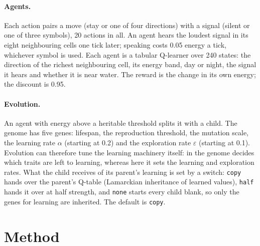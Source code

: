 \documentclass[letterpaper]{article}
\newcommand{\cond}[1]{\texttt{#1}}
\begin{document}
\paragraph{Agents.} Each action pairs a move (stay or one of four directions) with a signal (silent
or one of three symbols), 20 actions in all. An agent hears the loudest signal in its eight
neighbouring cells one tick later; speaking costs 0.05 energy a tick, whichever symbol is used. Each
agent is a tabular Q-learner \citep{watkins1992} over 240 states: the direction of the richest
neighbouring cell, its energy band, day or night, the signal it hears and whether it is near water.
The reward is the change in its own energy; the discount is 0.95.

\paragraph{Evolution.} An agent with energy above a heritable threshold splits it with a child. The
genome has five genes: lifespan, the reproduction threshold, the mutation scale, the learning rate
$\alpha$ (starting at 0.2) and the exploration rate $\varepsilon$ (starting at 0.1). Evolution can
therefore tune the learning machinery itself: in \citet{hinton1987} the genome decides which traits
are left to learning, whereas here it sets the learning and exploration rates. What the child receives of its parent's
learning is set by a switch: \cond{copy} hands over the parent's Q-table (Lamarckian inheritance of
learned values), \cond{half} hands it over at half strength, and \cond{none} starts every child blank,
so only the genes for learning are inherited. The default is \cond{copy}.

\section{Method}
\end{document}
